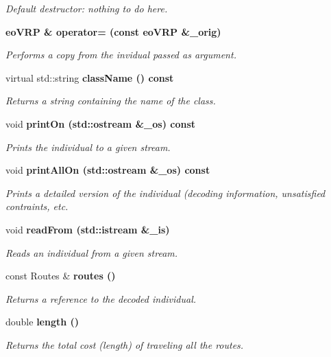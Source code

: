 \begin{CompactItemize}
\begin{CompactList}\small\item\em Default destructor: nothing to do here. \item\end{CompactList}\item 
\bf{eo\-VRP} \& \bf{operator=} (const \bf{eo\-VRP} \&\_\-orig)
\begin{CompactList}\small\item\em Performs a copy from the invidual passed as argument. \item\end{CompactList}\item 
virtual std::string \bf{class\-Name} () const 
\begin{CompactList}\small\item\em Returns a string containing the name of the class. \item\end{CompactList}\item 
void \bf{print\-On} (std::ostream \&\_\-os) const 
\begin{CompactList}\small\item\em Prints the individual to a given stream. \item\end{CompactList}\item 
void \bf{print\-All\-On} (std::ostream \&\_\-os) const 
\begin{CompactList}\small\item\em Prints a detailed version of the individual (decoding information, unsatisfied contraints, etc. \item\end{CompactList}\item 
void \bf{read\-From} (std::istream \&\_\-is)
\begin{CompactList}\small\item\em Reads an individual from a given stream. \item\end{CompactList}\item 
const Routes \& \bf{routes} ()
\begin{CompactList}\small\item\em Returns a reference to the decoded individual. \item\end{CompactList}\item 
double \bf{length} ()
\begin{CompactList}\small\item\em Returns the total cost (length) of traveling all the routes. \item\end{CompactList}\item 

\end{CompactItemize}
